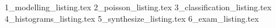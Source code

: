 \begin{appendices}
{1_modelling_listing.tex}
{2_poisson_listing.tex}
{3_classification_listing.tex}
{4_histograms_listing.tex}
{5_synthesize_listing.tex}
{6_exam_listing.tex}

\end{appendices}
